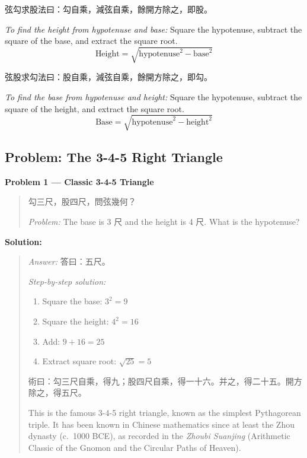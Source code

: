 \documentclass[11pt,a4paper]{article}
\newcommand{\zh}[1]{{#1}}
\newenvironment{chproblem}[1][]{%
  \par\medskip\noindent\textbf{\textcolor{sectioncolor}{#1}}\par\nopagebreak
  \begin{quote}\small
}{%
  \end{quote}\medskip
}
\newenvironment{chsolution}{%
  \par\medskip\noindent\textbf{\textcolor{notecolor}{Solution:}}\par\nopagebreak
  \begin{quote}\small
}{%
  \end{quote}\medskip
}
\newenvironment{chpassage}{%
  \par\medskip
  \begin{center}
  \begin{minipage}{0.95\textwidth}
  \setlength{\parindent}{2em}
  \linespread{1.3}\selectfont
}{%
  \end{minipage}
  \end{center}
  \medskip
}
\newenvironment{stepbystep}{%
  \par\smallskip\noindent\textit{Step-by-step solution:}\par\nopagebreak
  \begin{enumerate}[leftmargin=2em,label=\textbf{Step \arabic*:},ref=\arabic*]
}{%
  \end{enumerate}\medskip
}
\begin{document}
\begin{chpassage}
\zh{弦勾求股法曰：勾自乘，減弦自乘，餘開方除之，即股。}

\medskip
\textit{To find the height from hypotenuse and base:} Square the hypotenuse,
subtract the square of the base, and extract the square root.
\[
\text{Height} = \sqrt{\text{hypotenuse}^2 - \text{base}^2}
\]
\end{chpassage}

\begin{chpassage}
\zh{弦股求勾法曰：股自乘，減弦自乘，餘開方除之，即勾。}

\medskip
\textit{To find the base from hypotenuse and height:} Square the hypotenuse,
subtract the square of the height, and extract the square root.
\[
\text{Base} = \sqrt{\text{hypotenuse}^2 - \text{height}^2}
\]
\end{chpassage}

\subsection{Problem: The 3-4-5 Right Triangle}

\begin{chproblem}[Problem 1 --- Classic 3-4-5 Triangle]
\zh{勾三尺，股四尺，問弦幾何？}

\medskip
\textit{Problem:} The base is 3 \zh{尺} and the height is 4 \zh{尺}. What is
the hypotenuse?
\end{chproblem}

\begin{chsolution}
\textit{Answer:} \zh{答曰：五尺。}

\begin{stepbystep}
\item Square the base: $3^2 = 9$
\item Square the height: $4^2 = 16$
\item Add: $9 + 16 = 25$
\item Extract square root: $\sqrt{25} = 5$
\end{stepbystep}

\zh{術曰：勾三尺自乘，得九；股四尺自乘，得一十六。并之，得二十五。開方除之，得五尺。}

This is the famous 3-4-5 right triangle, known as the simplest Pythagorean
triple. It has been known in Chinese mathematics since at least the Zhou
dynasty (c.~1000 BCE), as recorded in the \textit{Zhoubi Suanjing} (Arithmetic
Classic of the Gnomon and the Circular Paths of Heaven).
\end{chsolution}
\end{document}
